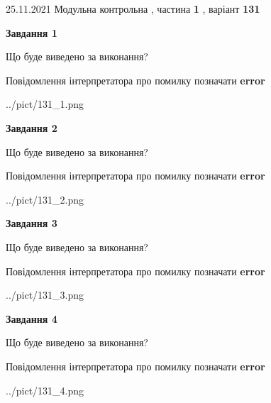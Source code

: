 \documentclass[10pt, ukrainian]{article}
\begin{document}
{25.11.2021 Модульна контрольна , частина \textbf { 1 }, варіант  \No \textbf { 131 }\par}
{
\begin {large}

{\begin {center}\textbf{Завдання 1}\end {center}}\par
Що буде виведено за виконання? \par
Повідомлення інтерпретатора про помилку позначати \textbf{error}

\begin{center}
	{../pict/131_1.png}
\end{center}
\newpage

{\begin {center}\textbf{Завдання 2}\end {center}}\par
Що буде виведено за виконання? \par
Повідомлення інтерпретатора про помилку позначати \textbf{error}

\begin{center}
	{../pict/131_2.png}
\end{center}
\newpage

{\begin {center}\textbf{Завдання 3}\end {center}}\par
Що буде виведено за виконання? \par
Повідомлення інтерпретатора про помилку позначати \textbf{error}

\begin{center}
	{../pict/131_3.png}
\end{center}
\newpage

{\begin {center}\textbf{Завдання 4}\end {center}}\par
Що буде виведено за виконання? \par
Повідомлення інтерпретатора про помилку позначати \textbf{error}

\begin{center}
	{../pict/131_4.png}
\end{center}
\newpage


\end{large}}
\end{document}
